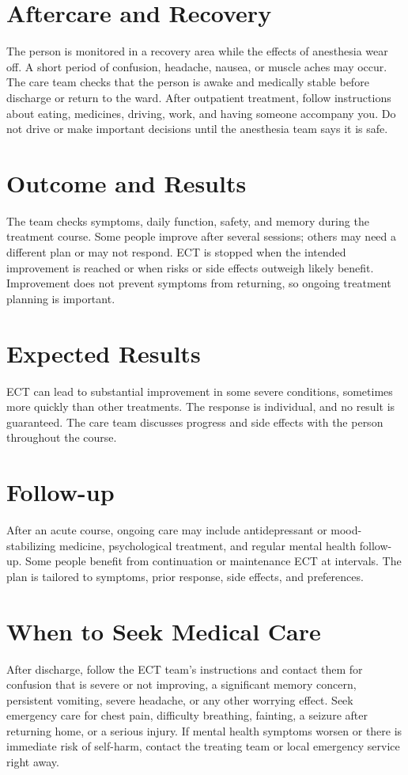 \section*{Aftercare and Recovery}
The person is monitored in a recovery area while the effects of anesthesia wear off. A short period of confusion, headache, nausea, or muscle aches may occur. The care team checks that the person is awake and medically stable before discharge or return to the ward. After outpatient treatment, follow instructions about eating, medicines, driving, work, and having someone accompany you. Do not drive or make important decisions until the anesthesia team says it is safe.

\section*{Outcome and Results}
The team checks symptoms, daily function, safety, and memory during the treatment course. Some people improve after several sessions; others may need a different plan or may not respond. ECT is stopped when the intended improvement is reached or when risks or side effects outweigh likely benefit. Improvement does not prevent symptoms from returning, so ongoing treatment planning is important.

\section*{Expected Results}
ECT can lead to substantial improvement in some severe conditions, sometimes more quickly than other treatments. The response is individual, and no result is guaranteed. The care team discusses progress and side effects with the person throughout the course.

\section*{Follow-up}
After an acute course, ongoing care may include antidepressant or mood-stabilizing medicine, psychological treatment, and regular mental health follow-up. Some people benefit from continuation or maintenance ECT at intervals. The plan is tailored to symptoms, prior response, side effects, and preferences.

\section*{When to Seek Medical Care}
After discharge, follow the ECT team's instructions and contact them for confusion that is severe or not improving, a significant memory concern, persistent vomiting, severe headache, or any other worrying effect. Seek emergency care for chest pain, difficulty breathing, fainting, a seizure after returning home, or a serious injury. If mental health symptoms worsen or there is immediate risk of self-harm, contact the treating team or local emergency service right away.

